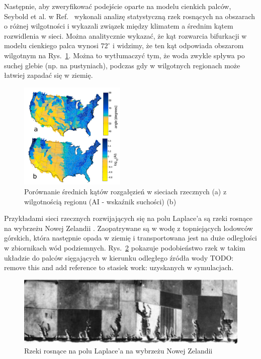 \documentclass[]{pracamgr}
\begin{document}
      Następnie, aby zweryfikować podejście oparte na modelu cienkich palców, Seybold et al. w Ref.~\cite{seybold2017climate, seybold2018branching} wykonali analizę statystyczną rzek rosnących na obszarach o różnej wilgotności i wykazali związek między klimatem a średnim kątem rozwidlenia w sieci. Można analitycznie wykazać, że kąt rozwarcia bifurkacji w modelu cienkiego palca wynosi $72^\circ$ \cite{hastings2001growth, carleson2002laplacian, gubiec2008fingered, devauchelle2012ramification} i widzimy, że ten kąt odpowiada obszarom wilgotnym na Rys.~\ref{klimat_katy}. Można to wytłumaczyć tym, że woda zwykle spływa po suchej glebie (np. na pustyniach), podczas gdy w wilgotnych regionach może łatwiej zapadać się w ziemię.

      \begin{figure}[H]
        \centering
        \includegraphics[width=0.45\textwidth]{figs/klimat_katy.png}
        \caption{Porównanie średnich kątów rozgałęzień w sieciach rzecznych (a) z wilgotnością regionu (AI - wskaźnik suchości) (b)}
        \label{klimat_katy}
      \end{figure}

      Przykładami sieci rzecznych rozwijających się na polu Laplace'a są rzeki rosnące na wybrzeżu Nowej Zelandii \cite{schumm1986composite}. Zaopatrywane są w wodę z topniejących lodowców górskich, która następnie opada w ziemię i transportowana jest na duże odległości w zbiornikach wód podziemnych. Rys.~\ref{nowa_zelandia} pokazuje podobieństwo rzek w takim układzie do palców sięgających w kierunku odległego źródła wody TODO: remove this and add reference to stasiek work: uzyskanych w symulacjach.

      \begin{figure}[h]
        \centering
        \includegraphics[width=1\textwidth]{figs/nowa_zelandia.png}
        \caption{Rzeki rosnące na polu Laplace'a na wybrzeżu Nowej Zelandii \cite{schumm1986composite}}
        \label{nowa_zelandia}
        \vspace{0pt}
      \end{figure}
\end{document}
